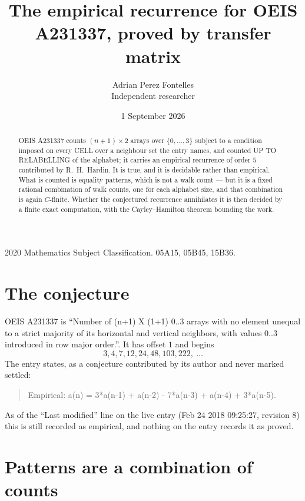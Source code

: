 \documentclass[11pt,a4paper]{article}
\title{The empirical recurrence for OEIS A231337, proved by transfer matrix}
\author{Adrian Perez Fontelles\\ \small Independent researcher}
\date{1 September 2026}
\theoremstyle{plain}
\theoremstyle{definition}
\begin{document}
\maketitle

\begin{abstract}
OEIS A231337 counts $(n+1)\times2$ arrays over $\{0,\dots,3\}$ subject to a condition imposed on
every CELL over a neighbour set the entry names, and counted UP TO RELABELLING of the
alphabet; it carries an empirical recurrence of order $5$ contributed by
R.~H.~Hardin. It is true, and it is decidable rather than empirical. What is counted is
equality patterns, which is not a walk count --- but it is a fixed rational combination of
walk counts, one for each alphabet size, and that combination is again $C$-finite. Whether the
conjectured recurrence annihilates it is then decided by a finite exact computation, with the
Cayley--Hamilton theorem bounding the work.
\end{abstract}

\noindent\small 2020 Mathematics Subject Classification. 05A15, 05B45, 15B36.\normalsize

\section{The conjecture}

OEIS A231337 is ``Number of (n+1) X (1+1) 0..3 arrays with no element unequal to a strict majority of its horizontal and vertical neighbors, with values 0..3 introduced in row major order.''. It has offset $1$ and begins
\[
3, 4, 7, 12, 24, 48, 103, 222,\ \dots
\]
The entry states, as a conjecture contributed by its author and never marked settled:
\begin{quote}
Empirical: a(n) = 3*a(n-1) + a(n-2) - 7*a(n-3) + a(n-4) + 3*a(n-5).
\end{quote}
As of the ``Last modified'' line on the live entry (Feb 24 2018 09:25:27, revision 8) this is still
recorded as empirical, and nothing on the entry records it as proved.

\section{Patterns are a combination of counts}
\end{document}
